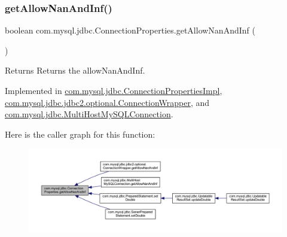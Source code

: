 \subsubsection{\texorpdfstring{get\+Allow\+Nan\+And\+Inf()}{getAllowNanAndInf()}}
{\footnotesize\ttfamily boolean com.\+mysql.\+jdbc.\+Connection\+Properties.\+get\+Allow\+Nan\+And\+Inf (\begin{DoxyParamCaption}{ }\end{DoxyParamCaption})}

\begin{DoxyReturn}{Returns}
Returns the allow\+Nan\+And\+Inf. 
\end{DoxyReturn}


Implemented in \mbox{\hyperlink{classcom_1_1mysql_1_1jdbc_1_1_connection_properties_impl_a7a2372abfe7156f94be2443ea7d4f29e}{com.\+mysql.\+jdbc.\+Connection\+Properties\+Impl}}, \mbox{\hyperlink{classcom_1_1mysql_1_1jdbc_1_1jdbc2_1_1optional_1_1_connection_wrapper_ae732025b7fe6d97377f2bd477fb87aea}{com.\+mysql.\+jdbc.\+jdbc2.\+optional.\+Connection\+Wrapper}}, and \mbox{\hyperlink{classcom_1_1mysql_1_1jdbc_1_1_multi_host_my_s_q_l_connection_a3f62430d18cd00a4f9e11a0271ad46af}{com.\+mysql.\+jdbc.\+Multi\+Host\+My\+S\+Q\+L\+Connection}}.

Here is the caller graph for this function\+:\nopagebreak
\begin{figure}[H]
\begin{center}
\leavevmode
\includegraphics[width=350pt]{interfacecom_1_1mysql_1_1jdbc_1_1_connection_properties_a2da790a00e98b06833dc0856c42d638a_icgraph}
\end{center}
\end{figure}
\mbox{\label{interfacecom_1_1mysql_1_1jdbc_1_1_connection_properties_aa0b1ef6e51c18b41376c5651833f11b8}} 
